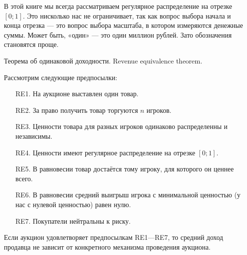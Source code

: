 В этой книге мы всегда рассматриваем регулярное распределение на отрезке $[0;1]$. Это нисколько нас не ограничивает, так как вопрос выбора начала и конца отрезка — это вопрос выбора масштаба, в котором измеряются денежные суммы. Может быть, «один» — это один миллион рублей. Зато обозначения становятся проще.


\begin{myth} Теорема об одинаковой доходности. Revenue equivalence theorem. 


Рассмотрим следующие предпосылки:

\begin{itemize}
\item[RE1.] На аукционе выставлен один товар.
\item[RE2.] За право получить товар торгуются $ n $ игроков.
\item[RE3.] Ценности товара для разных игроков одинаково распределенны и независимы.
\item[RE4.] Ценности имеют регулярное распределение на отрезке $ [0;1] $.
\item[RE5.] В равновесии товар достаётся тому игроку, для которого он ценнее всего.
\item[RE6.] В равновесии средний выигрыш игрока с минимальной ценностью (у нас с нулевой ценностью) равен нулю.
\item[RE7.] Покупатели нейтральны к риску.
\end{itemize}

Если аукцион удовлетворяет предпосылкам RE1—RE7, то средний доход продавца не зависит от конкретного механизма проведения аукциона.

\end{myth}


